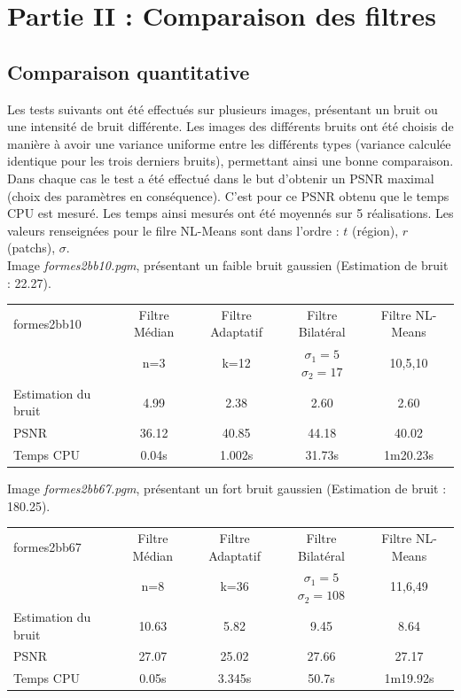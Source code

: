 \documentclass[a4,12pt]{article}
\begin{document}
\section{Partie II : Comparaison des filtres}
\subsection{Comparaison quantitative}

Les tests suivants ont été effectués sur plusieurs images, présentant un bruit ou une intensité de bruit différente. Les images des différents bruits ont été choisis de manière à avoir une variance uniforme entre les différents types (variance calculée identique pour les trois derniers bruits), permettant ainsi une bonne comparaison.\\

Dans chaque cas le test a été effectué dans le but d'obtenir un PSNR maximal (choix des paramètres en conséquence). C'est pour ce PSNR obtenu que le temps CPU est mesuré. Les temps ainsi mesurés ont été moyennés sur 5 réalisations. Les valeurs renseignées pour le filre NL-Means sont dans l'ordre : $t$ (région), $r$ (patchs), $\sigma$.\\

Image \textit{formes2bb10.pgm}, présentant un faible bruit gaussien (Estimation de bruit : 22.27).

\begin{center}
\begin{tabular}{|l||c|c|c|c|}
\hline
formes2bb10 & Filtre Médian & Filtre Adaptatif & Filtre Bilatéral & Filtre NL-Means \\
& n=3 & k=12 & $\sigma_1 = 5$ $\sigma_2 = 17$ & 10,5,10\\
\hline
Estimation du bruit
& 4.99
& 2.38
& 2.60
& 2.60\\
\hline
PSNR
& 36.12
& 40.85
& 44.18
& 40.02\\
\hline
Temps CPU
& 0.04s 
& 1.002s
& 31.73s
& 1m20.23s\\
\hline
\end{tabular} 
\end{center}

\vspace{2em}

Image \textit{formes2bb67.pgm}, présentant un fort bruit gaussien (Estimation de bruit : 180.25).

\begin{center}
\begin{tabular}{|l||c|c|c|c|}
\hline
formes2bb67 & Filtre Médian & Filtre Adaptatif & Filtre Bilatéral & Filtre NL-Means\\
& n=8 & k=36 & $\sigma_1 = 5$ $\sigma_2 = 108$ & 11,6,49\\
\hline
Estimation du bruit
& 10.63
& 5.82
& 9.45
& 8.64\\
\hline
PSNR
& 27.07
& 25.02
& 27.66
& 27.17\\
\hline
Temps CPU
& 0.05s
& 3.345s
& 50.7s
& 1m19.92s\\
\hline
\end{tabular} 
\end{center}
\end{document}
